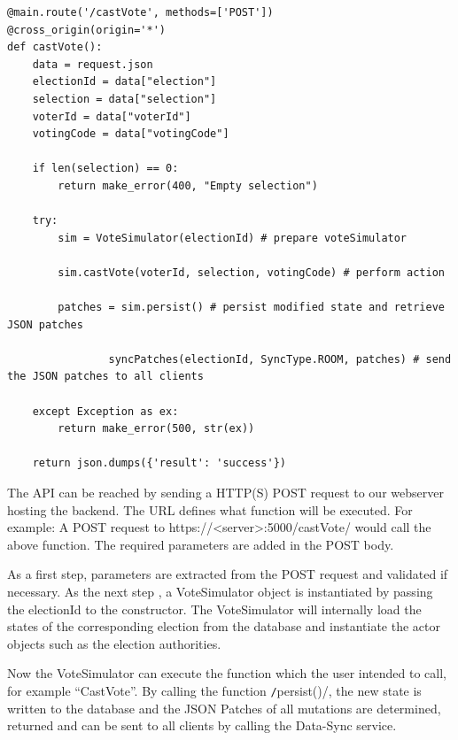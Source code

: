 \begin{verbatim}
@main.route('/castVote', methods=['POST'])
@cross_origin(origin='*')
def castVote():
    data = request.json
    electionId = data["election"]
    selection = data["selection"]
    voterId = data["voterId"]
    votingCode = data["votingCode"]

    if len(selection) == 0:
        return make_error(400, "Empty selection")

    try:        
        sim = VoteSimulator(electionId) # prepare voteSimulator
        
        sim.castVote(voterId, selection, votingCode) # perform action
        
        patches = sim.persist()	# persist modified state and retrieve JSON patches
        
				syncPatches(electionId, SyncType.ROOM, patches)	# send the JSON patches to all clients

    except Exception as ex:
        return make_error(500, str(ex))

    return json.dumps({'result': 'success'})
\end{verbatim}

The API can be reached by sending a HTTP(S) POST request to our webserver hosting the backend. The URL defines what function will be executed. For example: A POST request to https://<server>:5000/castVote/ would call the above function. The required parameters are added in the POST body.

As a first step, parameters are extracted from the POST request and validated if necessary. As the next step , a VoteSimulator object is instantiated by passing the electionId to the constructor. The VoteSimulator will internally load the states of the corresponding election from the database and instantiate the actor objects such as the election authorities.

Now the VoteSimulator can execute the function which the user intended to call, for example "`CastVote"'. By calling the function \texttt/persist()/, the new state is written to the database and the JSON Patches of all mutations are determined, returned and can be sent to all clients by calling the Data-Sync service.

